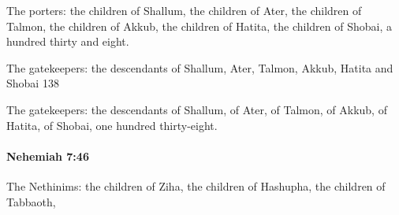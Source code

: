 			\begin{versebox}
					\item[BHS] 
					\item[LXX] 
					\item[ASV] The porters: the children of Shallum, the children of Ater, the children of Talmon, the children of Akkub, the children of Hatita, the children of Shobai, a hundred thirty and eight.
					\item[NIV] The gatekeepers: the descendants of Shallum, Ater, Talmon, Akkub, Hatita and Shobai 138
					\item[NRSV] The gatekeepers: the descendants of Shallum, of Ater, of Talmon, of Akkub, of Hatita, of Shobai, one hundred thirty-eight.
			\end{versebox}

		\paragraph{Nehemiah 7:46} %
			\label{NEHEMIAH-7-46}

			The Nethinims: the children of Ziha, the children of Hashupha, the children of Tabbaoth,

